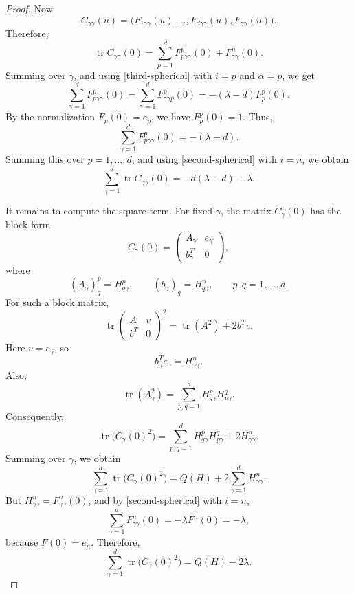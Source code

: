 \documentclass[10pt,a4paper]{amsart}
\DeclareMathOperator{\tr}{tr}
\begin{document}
\begin{proof}
Now
\[
        C_{\gamma\gamma}(u)
        =
        \bigl(F_{1\gamma\gamma}(u),\ldots,F_{d\gamma\gamma}(u),
              F_{\gamma\gamma}(u)\bigr).
\]
Therefore,
\[
        \tr C_{\gamma\gamma}(0)
        =
        \sum_{p=1}^{d}F^p_{p\gamma\gamma}(0)
        +
        F^n_{\gamma\gamma}(0).
\]
Summing over \(\gamma\), and using \eqref{third-spherical} with \(i=p\) and
\(\alpha=p\), we get
\[
        \sum_{\gamma=1}^{d}F^p_{p\gamma\gamma}(0)
        =
        \sum_{\gamma=1}^{d}F^p_{\gamma\gamma p}(0)
        =
        -(\lambda-d)F^p_p(0).
\]
By the normalization \(F_p(0)=e_p\), we have \(F^p_p(0)=1\). Thus,
\[
        \sum_{\gamma=1}^{d}F^p_{p\gamma\gamma}(0)=-(\lambda-d).
\]
Summing this over \(p=1,\ldots,d\), and using \eqref{second-spherical} with
\(i=n\), we obtain
\begin{equation}\label{trace-Cgammagamma}
        \sum_{\gamma=1}^{d}\tr C_{\gamma\gamma}(0)
        =
        -d(\lambda-d)-\lambda.
\end{equation}

It remains to compute the square term. For fixed \(\gamma\), the matrix
\(C_\gamma(0)\) has the block form
\[
        C_\gamma(0)
        =
        \begin{pmatrix}
        A_\gamma & e_\gamma\\
        b_\gamma^T & 0
        \end{pmatrix},
\]
where
\[
        (A_\gamma)^p_q=H^p_{q\gamma},
        \qquad
        (b_\gamma)_q=H^n_{q\gamma},
        \qquad
        p,q=1,\ldots,d.
\]
For such a block matrix,
\[
        \tr
        \begin{pmatrix}
        A & v\\
        b^T & 0
        \end{pmatrix}^{\!2}
        =
        \tr(A^2)+2b^Tv.
\]
Here \(v=e_\gamma\), so
\[
        b_\gamma^Te_\gamma=H^n_{\gamma\gamma}.
\]
Also,
\[
        \tr(A_\gamma^2)=\sum_{p,q=1}^{d}H^p_{q\gamma}H^q_{p\gamma}.
\]
Consequently,
\[
        \tr\bigl(C_\gamma(0)^2\bigr)
        =
        \sum_{p,q=1}^{d}H^p_{q\gamma}H^q_{p\gamma}
        +
        2H^n_{\gamma\gamma}.
\]
Summing over \(\gamma\), we obtain
\[
        \sum_{\gamma=1}^{d}\tr\bigl(C_\gamma(0)^2\bigr)
        =
        Q(H)+2\sum_{\gamma=1}^{d}H^n_{\gamma\gamma}.
\]
But \(H^n_{\gamma\gamma}=F^n_{\gamma\gamma}(0)\), and by
\eqref{second-spherical} with \(i=n\),
\[
        \sum_{\gamma=1}^{d}F^n_{\gamma\gamma}(0)
        =
        -\lambda F^n(0)
        =
        -\lambda,
\]
because \(F(0)=e_n\). Therefore,
\begin{equation}\label{trace-Cgamma-square}
        \sum_{\gamma=1}^{d}\tr\bigl(C_\gamma(0)^2\bigr)
        =
        Q(H)-2\lambda.
\end{equation}


\end{proof}
\end{document}
